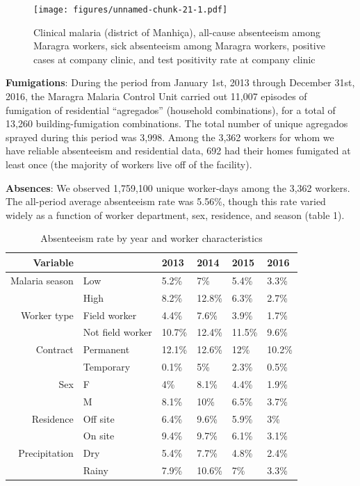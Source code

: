 \documentclass[]{article}
\begin{document}
\begin{figure}
\centering
\texttt{[image: figures/unnamed-chunk-21-1.pdf]}
\caption{Clinical malaria (district of Manhiça), all-cause absenteeism
among Maragra workers, sick absenteeism among Maragra workers, positive
cases at company clinic, and test positivity rate at company clinic}
\end{figure}

\textbf{Fumigations}: During the period from January 1st, 2013 through
December 31st, 2016, the Maragra Malaria Control Unit carried out 11,007
episodes of fumigation of residential ``agregados'' (household
combinations), for a total of 13,260 building-fumigation combinations.
The total number of unique agregados sprayed during this period was
3,998. Among the 3,362 workers for whom we have reliable absenteeism and
residential data, 692 had their homes fumigated at least once (the
majority of workers live off of the facility).

\textbf{Absences}: We observed 1,759,100 unique worker-days among the
3,362 workers. The all-period average absenteeism rate was 5.56\%,
though this rate varied widely as a function of worker department, sex,
residence, and season (table 1).

\begin{table}[ht]
\centering
\begin{tabular}{rlllll}
  \hline
Variable &  & 2013 & 2014 & 2015 & 2016 \\ 
  \hline
Malaria season & Low & 5.2\% & 7\% & 5.4\% & 3.3\% \\ 
   & High & 8.2\% & 12.8\% & 6.3\% & 2.7\% \\ 
  Worker type & Field worker & 4.4\% & 7.6\% & 3.9\% & 1.7\% \\ 
   & Not field worker & 10.7\% & 12.4\% & 11.5\% & 9.6\% \\ 
  Contract & Permanent & 12.1\% & 12.6\% & 12\% & 10.2\% \\ 
   & Temporary & 0.1\% & 5\% & 2.3\% & 0.5\% \\ 
  Sex & F & 4\% & 8.1\% & 4.4\% & 1.9\% \\ 
   & M & 8.1\% & 10\% & 6.5\% & 3.7\% \\ 
  Residence & Off site & 6.4\% & 9.6\% & 5.9\% & 3\% \\ 
   & On site & 9.4\% & 9.7\% & 6.1\% & 3.1\% \\ 
  Precipitation & Dry & 5.4\% & 7.7\% & 4.8\% & 2.4\% \\ 
   & Rainy & 7.9\% & 10.6\% & 7\% & 3.3\% \\ 
   \hline
\end{tabular}
\caption{Absenteeism rate by year and worker characteristics} 
\end{table}
\end{document}
